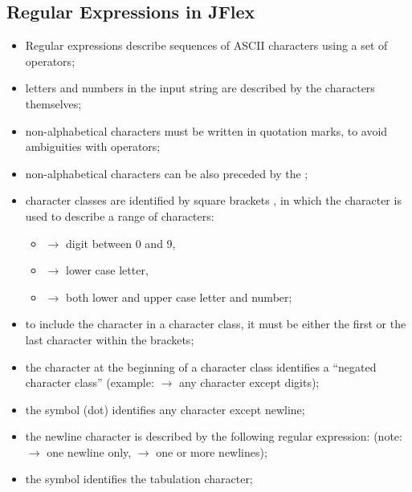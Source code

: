 \subsection{Regular Expressions in JFlex}
\begin{itemize}
	\item Regular expressions describe sequences of ASCII characters using a set of operators;
	\item letters and numbers in the input string are described by the characters themselves;
	\item non-alphabetical characters must be written in quotation marks, to avoid ambiguities with operators;
	\item non-alphabetical characters can be also preceded by the \code{\\};
	\item character classes are identified by square brackets \code{[]}, in which the \code{-} character is used to describe a range of characters:
	\begin{itemize}
		\item \code{[0-9]} $\to$ digit between 0 and 9,
		\item \code{[a-z]} $\to$ lower case letter,
		\item \code{[a-zA-Z0-9]} $\to$ both lower and upper case letter and number;
	\end{itemize}
	\item to include the character \code{-} in a character class, it must be either the first or the last character within the brackets;
	\item the character \code{^} at the beginning of a character class identifies a ``negated character class'' (example: \code{[^0-9]} $\to$ any character except digits);
	\item the symbol  (dot) identifies any character except newline;
	\item the newline character is described by the following regular expression: \code{\\n\|\\r\|\\r\\n} (note: \code{\\n\|\\r\|\\r\\n} $\to$ one newline only, \code{[\\n\\r]+} $\to$ one or more newlines);
	\item the symbol \code{\\t} identifies the tabulation character;

\end{itemize}
